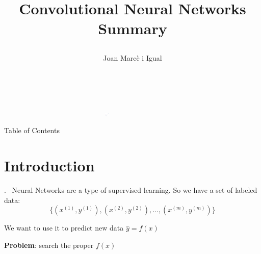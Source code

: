 \documentclass[xcolor={x11names, table}, compress]{beamer}
\newcommand{\insertsec}{\thesection.~\insertsection}
\begin{document}
{ 
    \begin{frame}
    
    \vspace{-1.5cm}
    \hfill{}
    \begin{flushleft}
        \hspace{-1cm}\includegraphics[width=0.8\textwidth, height=0.4em]{title_line.pdf}\hfill
        
        \title{
            \begin{flushleft}{\huge \color{BHKpresentationDark} 
            Convolutional Neural Networks Summary
        } 
        \end{flushleft}}
        
        \date{$~~$}
        \author[Joan]{\begin{flushleft}\vspace{-1cm} Joan Marcè i Igual\end{flushleft}}
        \titlepage
    \end{flushleft}
\end{frame}
}

\begin{frame}{Table of Contents}
	\tableofcontents
\end{frame}

\section{Introduction}
\begin{frame}{\insertsec}
	Neural Networks are a type of supervised learning. So we have a set of labeled data:
	$$\{(x^{(1)}, y^{(1)}), (x^{(2)}, y^{(2)}), ..., (x^{(m)}, y^{(m)})\}$$
	
	We want to use it to predict new data $\hat{y} = f(x)$
	
	\textbf{Problem}: search the proper $f(x)$
\end{frame}
\end{document}

